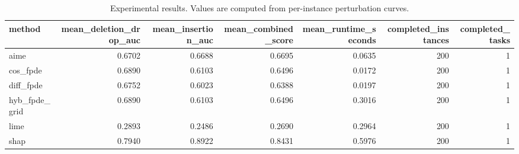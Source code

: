 \begin{table}[t]
\caption{Experimental results. Values are computed from per-instance perturbation curves.}
\label{tab:main_results_computed}
\centering
\begin{tabular}{lrrrrrr}
\toprule
method & mean\_deletion\_drop\_auc & mean\_insertion\_auc & mean\_combined\_score & mean\_runtime\_seconds & completed\_instances & completed\_tasks \\
\midrule
aime & 0.6702 & 0.6688 & 0.6695 & 0.0635 & 200 & 1 \\
cos\_fpde & 0.6890 & 0.6103 & 0.6496 & 0.0172 & 200 & 1 \\
diff\_fpde & 0.6752 & 0.6023 & 0.6388 & 0.0197 & 200 & 1 \\
hyb\_fpde\_grid & 0.6890 & 0.6103 & 0.6496 & 0.3016 & 200 & 1 \\
lime & 0.2893 & 0.2486 & 0.2690 & 0.2964 & 200 & 1 \\
shap & 0.7940 & 0.8922 & 0.8431 & 0.5976 & 200 & 1 \\
\bottomrule
\end{tabular}

\end{table}
